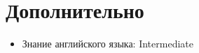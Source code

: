 \documentclass[a4paper,9pt]{report}
\begin{document}
\section{Дополнительно}

\begin{itemize}
    \item{Знание английского языка: Intermediate}
\end{itemize}
\end{document}
